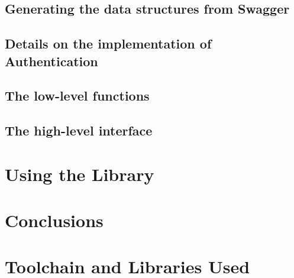 \documentclass[11pt]{report}
\begin{document}
\section{Generating the data structures from Swagger} %

\section{Details on the implementation of Authentication} %

\section{The low-level functions} %

\section{The high-level interface} %


\chapter{Using the Library} %


\chapter{Conclusions} %


\chapter{Toolchain and Libraries Used}



\nocite{*}


\end{document}
